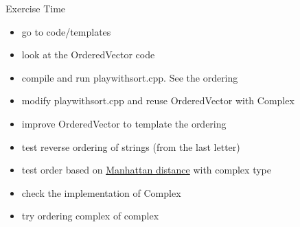\begin{frame}[fragile]
  \begin{alertblock}{Exercise Time}
    \begin{itemize}
    \item go to code/templates
    \item look at the OrderedVector code
    \item compile and run playwithsort.cpp. See the ordering
    \item modify playwithsort.cpp and reuse OrderedVector with Complex
    \item improve OrderedVector to template the ordering
    \item test reverse ordering of strings (from the last letter)
    \item test order based on {\color{blue} \href{https://en.wikipedia.org/wiki/Taxicab_geometry}{Manhattan distance}} with complex type
    \item check the implementation of Complex
    \item try ordering complex of complex
    \end{itemize}
  \end{alertblock}
\end{frame}
